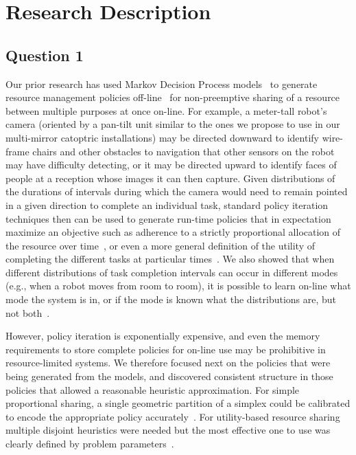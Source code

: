 \section{Research Description}
\label{sec:research}

\subsection{Question 1}



Our prior research has used Markov Decision Process
models~\cite{gtsg08} to generate resource management policies
off-line~\cite{gtgs09} for non-preemptive sharing of a resource
between multiple purposes at once on-line.  For example, a meter-tall robot's
camera (oriented by a pan-tilt unit similar to the ones we propose to
use in our multi-mirror catoptric installations) may be directed
downward to identify wire-frame chairs and other obstacles to
navigation that other sensors on the robot may have difficulty
detecting, or it may be directed upward to identify faces of people at
a reception whose images it can then capture. Given distributions of
the durations of intervals during which the camera would need to
remain pointed in a given direction to complete an individual task,
standard policy iteration techniques then can be used to generate
run-time policies that in expectation maximize an objective such as
adherence to a strictly proportional allocation of the resource over
time~\cite{gtsg08}, or even a more general definition of the utility 
of completing the different tasks at particular times~\cite{tggs10}.
We also showed that when different distributions of task completion
intervals can occur in different modes (e.g., when a robot moves
from room to room), it is possible to learn on-line what mode
the system is in, or if the mode is known what the distributions are,
but not both~\cite{gtgsuai10}.

However, policy iteration is exponentially expensive, and even the memory 
requirements to store complete policies for on-line use may be prohibitive 
in resource-limited systems.  We therefore focused next on the policies 
that were being generated from the models, and discovered consistent 
structure in those policies that allowed a reasonable heuristic 
approximation.  For simple proportional sharing, a single geometric partition
of a simplex could be calibrated to encode the appropriate policy accurately~\cite{gtspmgs10}.
For utility-based resource sharing multiple disjoint heuristics were needed but
the most effective one to use was clearly defined by problem parameters~\cite{tblwgs11}.

